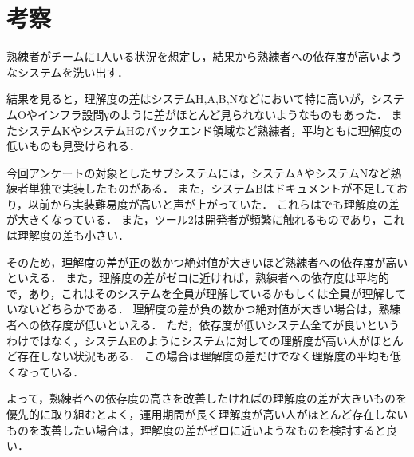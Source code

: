 \section{考察}
熟練者がチームに1人いる状況を想定し，結果から熟練者への依存度が高いようなシステムを洗い出す．

結果を見ると，理解度の差はシステムH,A,B,Nなどにおいて特に高いが，システムOやインフラ設問γのように差がほとんど見られないようなものもあった．
またシステムKやシステムHのバックエンド領域など熟練者，平均ともに理解度の低いものも見受けられる．

今回アンケートの対象としたサブシステムには，システムAやシステムNなど熟練者単独で実装したものがある．
また，システムBはドキュメントが不足しており，以前から実装難易度が高いと声が上がっていた．
これらはでも理解度の差が大きくなっている．
また，ツール2は開発者が頻繁に触れるものであり，これは理解度の差も小さい．

そのため，理解度の差が正の数かつ絶対値が大きいほど熟練者への依存度が高いといえる．
また，理解度の差がゼロに近ければ，熟練者への依存度は平均的で，あり，これはそのシステムを全員が理解しているかもしくは全員が理解していないどちらかである．
理解度の差が負の数かつ絶対値が大きい場合は，熟練者への依存度が低いといえる．
ただ，依存度が低いシステム全てが良いというわけではなく，システムEのようにシステムに対しての理解度が高い人がほとんど存在しない状況もある．
この場合は理解度の差だけでなく理解度の平均も低くなっている．

よって，熟練者への依存度の高さを改善したければの理解度の差が大きいものを優先的に取り組むとよく，運用期間が長く理解度が高い人がほとんど存在しないものを改善したい場合は，理解度の差がゼロに近いようなものを検討すると良い．
